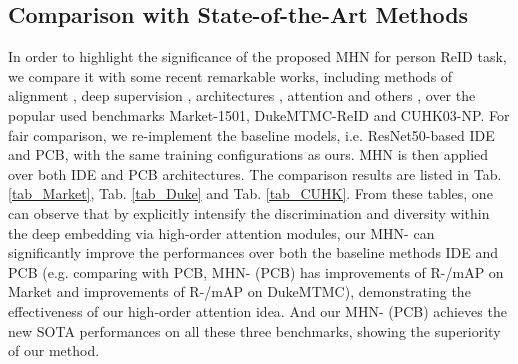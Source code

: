 \documentclass[10pt,twocolumn,letterpaper]{article}
\begin{document}
\subsection{Comparison with State-of-the-Art Methods}\vspace{-0.6em}
In order to highlight the significance of the proposed MHN for person ReID task, we compare it with some recent remarkable works, including methods of alignment \cite{shen2018end,suh2018part,zheng2018re,sun2018beyond}, deep supervision \cite{wang2018resource}, architectures \cite{zheng2016person,sun2018beyond}, attention \cite{li2018harmonious,zheng2018re,Wang_2018_ECCV} and others \cite{sun2017svdnet,chen2018group,chang2018multi}, over the popular used benchmarks Market-1501, DukeMTMC-ReID and CUHK03-NP. For fair comparison, we re-implement the baseline models, i.e. ResNet50-based IDE and PCB, with the same training configurations as ours. MHN is then applied over both IDE and PCB architectures. The comparison results are listed in Tab. \ref{tab_Market}, Tab. \ref{tab_Duke} and Tab. \ref{tab_CUHK}. From these tables, one can observe that by explicitly intensify the discrimination and diversity within the deep embedding via high-order attention modules, our MHN- can significantly improve the performances over both the baseline methods IDE and PCB (e.g. comparing with PCB, MHN- (PCB) has  improvements of R-/mAP on Market and  improvements of R-/mAP on DukeMTMC), demonstrating the effectiveness of our high-order attention idea. And our MHN- (PCB) achieves the new SOTA performances on all these three benchmarks, showing the superiority of our method.
\vspace{-0.5em}
\end{document}
